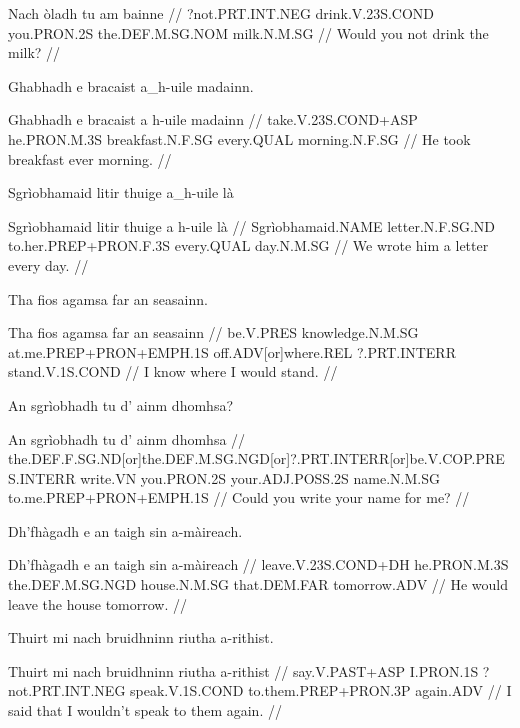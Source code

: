 \documentclass[a4paper,10pt]{article}
\begin{document}
\vspace{4mm}
\gla Nach òladh tu am bainne  //
\glb ?not.PRT.INT.NEG drink.V.23S.COND you.PRON.2S the.DEF.M.SG.NOM milk.N.M.SG  //
\glft Would you not drink the milk? //
\endgl
\xe

\ex
\begingl
\glpre Ghabhadh e bracaist a\_h-uile madainn. 

\vspace{4mm}
\gla Ghabhadh e bracaist {a h-uile} madainn  //
\glb take.V.23S.COND+ASP he.PRON.M.3S breakfast.N.F.SG every.QUAL morning.N.F.SG  //
\glft He took breakfast ever morning. //
\endgl
\xe

\ex
\begingl
\glpre Sgrìobhamaid litir thuige a\_h-uile là 

\vspace{4mm}
\gla Sgrìobhamaid litir thuige {a h-uile} là  //
\glb Sgrìobhamaid.NAME letter.N.F.SG.ND to.her.PREP+PRON.F.3S every.QUAL day.N.M.SG  //
\glft We wrote him a letter every day. //
\endgl
\xe

\ex
\begingl
\glpre Tha fios agamsa far an seasainn. 

\vspace{4mm}
\gla Tha fios agamsa far an seasainn  //
\glb be.V.PRES knowledge.N.M.SG at.me.PREP+PRON+EMPH.1S off.ADV[or]where.REL ?.PRT.INTERR stand.V.1S.COND  //
\glft I know where I would stand. //
\endgl
\xe

\ex
\begingl
\glpre An sgrìobhadh tu d' ainm dhomhsa? 

\vspace{4mm}
\gla An sgrìobhadh tu d' ainm dhomhsa  //
\glb the.DEF.F.SG.ND[or]the.DEF.M.SG.NGD[or]?.PRT.INTERR[or]be.V.COP.PRES.INTERR write.VN you.PRON.2S your.ADJ.POSS.2S name.N.M.SG to.me.PREP+PRON+EMPH.1S  //
\glft Could you write your name for me? //
\endgl
\xe

\ex
\begingl
\glpre Dh'fhàgadh e an taigh sin a-màireach. 

\vspace{4mm}
\gla Dh'fhàgadh e an taigh sin a-màireach  //
\glb leave.V.23S.COND+DH he.PRON.M.3S the.DEF.M.SG.NGD house.N.M.SG that.DEM.FAR tomorrow.ADV  //
\glft He would leave the house tomorrow. //
\endgl
\xe

\ex
\begingl
\glpre Thuirt mi nach bruidhninn riutha a-rithist. 

\vspace{4mm}
\gla Thuirt mi nach bruidhninn riutha a-rithist  //
\glb say.V.PAST+ASP I.PRON.1S ?not.PRT.INT.NEG speak.V.1S.COND to.them.PREP+PRON.3P again.ADV  //
\glft I said that I wouldn't speak to them again. //
\endgl
\xe
\end{document}
